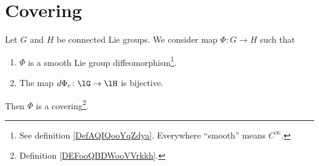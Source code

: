 \section{Covering}

\begin{lemma}     \label{LEMooSYVQooTjkgBL}
	Let \( G\) and \( H\) be connected Lie groups. We consider map \( \Phi\colon G\to H\) such that
	\begin{enumerate}
		\item
		      \( \Phi\) is a smooth Lie group diffeomorphism\footnote{See definition \ref{DefAQIQooYqZdya}. Everywhere ``smooth'' means \(  C^{\infty}\).}.
		\item
		      The map \( d\Phi_e\colon \lG\to \lH\) is bijective.
	\end{enumerate}
	Then \( \Phi\) is a covering\footnote{Definition \ref{DEFooQBDWooVVrkkh}.}.
\end{lemma}

